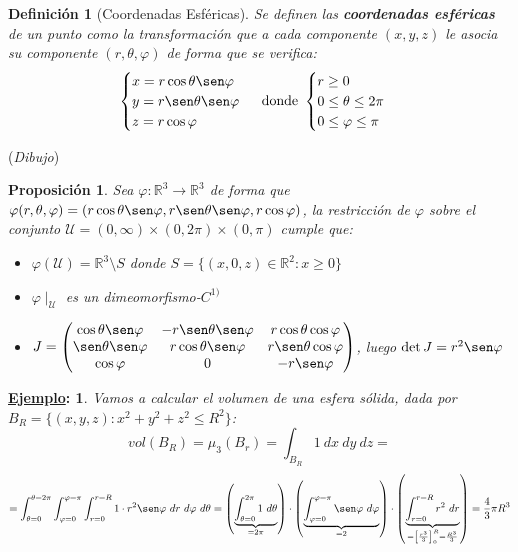 \documentclass[10pt,a4paper,openright]{book}
\theoremstyle{break}
\newtheorem*{defi}{Definición}
\newtheorem*{prop}{Proposición}
\newtheorem*{ej}{\underline{Ejemplo}:}
\newcommand{\dif}[1]{\ d#1}
\begin{document}
\begin{defi}[Coordenadas Esféricas]
Se definen las \textbf{coordenadas esféricas} de un punto como la transformación que a cada componente $(x,y,z)$ le asocia su componente $(r, \theta, \varphi)$ de forma que se verifica:
$$\begin{cases} x = r\cos \theta \sen \varphi\\ y = r\sen \theta \sen \varphi\\ z = r\cos \varphi \end{cases}\mbox{ donde }\begin{cases} r \ge 0\\ 0 \le \theta \le 2\pi\\ 0 \le \varphi \le \pi \end{cases}$$
\end{defi}

(\textit{Dibujo})

\begin{prop}
Sea $\varphi: \mathbb{R}^3\rightarrow  \mathbb{R}^3$ de forma que $\varphi(r, \theta, \varphi) = (r\cos \theta \sen \varphi, r\sen \theta \sen \varphi, r\cos \varphi)$, la restricción de $\varphi$ sobre el conjunto $\mathcal{U} = (0,\infty)\times (0, 2\pi) \times (0, \pi)$ cumple que:
\begin{itemize}
\item $\varphi(\mathcal{U}) = \mathbb{R}^3\setminus{S}$ donde $S = \{(x,0,z)\in \mathbb{R}^2: x\geq 0\}$
\item $\varphi\mid_\mathcal{U}$ es un dimeomorfismo-$C^{1)}$
\item $J = \begin{pmatrix} \cos \theta \sen \varphi & -r\sen \theta \sen \varphi & r\cos \theta \cos \varphi\\ \sen \theta \sen \varphi & r\cos \theta \sen \varphi & r\sen \theta \cos\varphi\\ \cos \varphi & 0 & -r\sen \varphi \end{pmatrix}$, luego $\det J = r^2 \sen\varphi$
\end{itemize}
\end{prop}

\begin{ej}
Vamos a calcular el volumen de una esfera sólida, dada por $B_R = \{\left(x, y, z\right) : x^2 + y^2 + z^2 \le R^2\}$:
$$vol \left(B_R\right) = \mu_3 \left(B_r\right) = \int_{B_R} 1 \dif{x} \dif{y} \dif{z}=$$
$$= \int_{\theta = 0}^{\theta = 2\pi }\int_{\varphi = 0}^{\varphi = \pi} \int_{r = 0}^{r = R} 1 \cdot r^2 \sen \varphi \dif{r} \dif{\varphi } \dif{\theta} = \left(\underbrace{\int_{\theta = 0}^{2\pi }1 \dif{\theta }}_{= 2\pi} \right) \cdot \left(\underbrace{\int_{\varphi = 0}^{\varphi = \pi} \sen \varphi \dif{\varphi }}_{= 2}\right) \cdot \left(\underbrace{\int_{r = 0}^{r = R} r^2 \dif{r}}_{= \left[\frac{r^3}{3}\right]_0^R = \frac{R^3}{3}}\right) = \frac{4}{3} \pi R^3$$
\end{ej}
\end{document}
